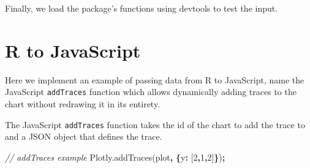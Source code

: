 \documentclass[
]{krantz}
\makeatletter
\newenvironment{Shaded}{\begin{snugshade}}{\end{snugshade}}
\newcommand{\AttributeTok}[1]{\textcolor[rgb]{0.61,0.61,0.61}{#1}}
\newcommand{\CommentTok}[1]{\textcolor[rgb]{0.37,0.37,0.37}{\textit{#1}}}
\newcommand{\ControlFlowTok}[1]{\textcolor[rgb]{0.27,0.27,0.27}{\textbf{#1}}}
\newcommand{\DataTypeTok}[1]{\textcolor[rgb]{0.27,0.27,0.27}{#1}}
\newcommand{\DecValTok}[1]{\textcolor[rgb]{0.06,0.06,0.06}{#1}}
\newcommand{\KeywordTok}[1]{\textcolor[rgb]{0.27,0.27,0.27}{\textbf{#1}}}
\newcommand{\NormalTok}[1]{#1}
\newcommand{\OperatorTok}[1]{\textcolor[rgb]{0.43,0.43,0.43}{\textbf{#1}}}
\newcommand{\StringTok}[1]{\textcolor[rgb]{0.5,0.5,0.5}{#1}}
\newcommand{\VariableTok}[1]{\textcolor[rgb]{0,0,0}{#1}}
\newenvironment{kframe}{%
\medskip{}
\setlength{\fboxsep}{.8em}
 \def\at@end@of@kframe{}%
 \ifinner\ifhmode%
  \def\at@end@of@kframe{\end{minipage}}%
  \begin{minipage}{\columnwidth}%
 \fi\fi%
 \def\FrameCommand##1{\hskip\@totalleftmargin \hskip-\fboxsep
 \colorbox{shadecolor}{##1}\hskip-\fboxsep
     \hskip-\linewidth \hskip-\@totalleftmargin \hskip\columnwidth}%
 \MakeFramed {\advance\hsize-\width
   \@totalleftmargin\z@ \linewidth\hsize
   \@setminipage}}%
 {\par\unskip\endMakeFramed%
 \at@end@of@kframe}
\renewenvironment{Shaded}{\begin{kframe}}{\end{kframe}}
\makeatother
\begin{document}
Finally, we load the package's functions using devtools to test the input.

\begin{Shaded}
\end{Shaded}

\hypertarget{widgets-ex-plotly-r-to-js}{%
\section{R to JavaScript}\label{widgets-ex-plotly-r-to-js}}

Here we implement an example of passing data from R to JavaScript, name the JavaScript \texttt{addTraces} function which allows dynamically adding traces to the chart without redrawing it in its entirety.

The JavaScript \texttt{addTraces} function takes the id of the chart to add the trace to and a JSON object that defines the trace.

\begin{Shaded}
\begin{Highlighting}[]
\CommentTok{// addTraces example}
\VariableTok{Plotly}\NormalTok{.}\AttributeTok{addTraces}\NormalTok{(}\StringTok{\textquotesingle{}plot\textquotesingle{}}\OperatorTok{,} \OperatorTok{\{}\DataTypeTok{y}\OperatorTok{:}\NormalTok{ [}\DecValTok{2}\OperatorTok{,}\DecValTok{1}\OperatorTok{,}\DecValTok{2}\NormalTok{]}\OperatorTok{\}}\NormalTok{)}\OperatorTok{;}
\end{Highlighting}
\end{Shaded}
\end{document}
